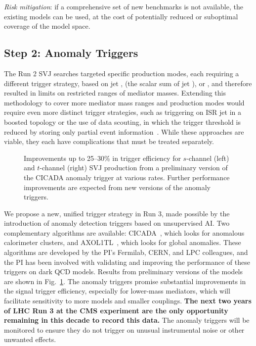 \textit{Risk mitigation}: if a comprehensive set of new benchmarks is not available, the existing models can be used, at the cost of potentially reduced or suboptimal coverage of the model space.

\subsection{Step 2: Anomaly Triggers}\label{subsec:trig}

The Run 2 SVJ searches targeted specific production modes, each requiring a different trigger strategy, based on jet \pt, \HT (the scalar sum of jet \pt), or \ptmiss,
and therefore resulted in limits on restricted ranges of mediator masses.
Extending this methodology to cover more mediator mass ranges and production modes would require even more distinct trigger strategies,
such as triggering on ISR jet \pt in a boosted topology or the use of data scouting, in which the \HT trigger threshold is reduced by storing only partial event information~\cite{Mukherjee:2019anz}.
While these approaches are viable, they each have complications that must be treated separately.

\begin{figure}[htb!]
\centering
{}
\caption{Improvements up to 25--30\% in trigger efficiency for $s$-channel (left) and $t$-channel (right) SVJ production
from a preliminary version of the CICADA anomaly trigger at various rates.
Further performance improvements are expected from new versions of the anomaly triggers.}
\label{fig:svjanomaly}
\end{figure}

We propose a new, unified trigger strategy in Run 3, made possible by the introduction of anomaly detection triggers based on unsupervised AI.
Two complementary algorithms are available: CICADA~\cite{CMS-DP-2023-086}, which looks for anomalous calorimeter clusters, and AXOL1TL~\cite{CMS-DP-2023-079}, which looks for global anomalies.
These algorithms are developed by the PI's Fermilab, CERN, and LPC colleagues, and the PI has been involved with validating and improving the performance of these triggers on dark QCD models.
Results from preliminary versions of the models are shown in Fig.~\ref{fig:svjanomaly}.
The anomaly triggers promise substantial improvements in the signal trigger efficiency, especially for lower-mass mediators,
which will facilitate sensitivity to more models and smaller couplings.
\textbf{The next two years of LHC Run 3 at the CMS experiment are the only opportunity remaining in this decade to record this data.}
The anomaly triggers will be monitored to ensure they do not trigger on unusual instrumental noise or other unwanted effects.

